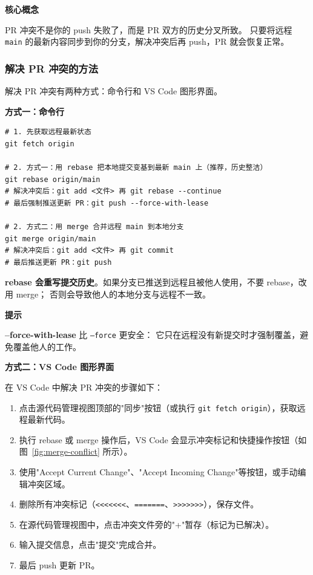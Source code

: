 \documentclass[12pt,a4paper,openany]{ctexbook}
\newenvironment{tipbox}{%
  \medskip
  \noindent\textbf{\faLightbulb\; 提示}
  \smallskip
}{%
  \medskip
}
\newenvironment{keybox}{%
  \medskip
  \noindent\textbf{\faKey\; 核心概念}
  \smallskip
}{%
  \medskip
}
\begin{document}
\begin{keybox}
PR 冲突不是你的 push 失败了，而是 PR 双方的历史分叉所致。
只要将远程 \texttt{main} 的最新内容同步到你的分支，解决冲突后再 push，PR 就会恢复正常。
\end{keybox}

\subsubsection{解决 PR 冲突的方法}

解决 PR 冲突有两种方式：命令行和 VS Code 图形界面。

\textbf{方式一：命令行}

\begin{lstlisting}[style=shell]
# 1. 先获取远程最新状态
git fetch origin

# 2. 方式一：用 rebase 把本地提交变基到最新 main 上（推荐，历史整洁）
git rebase origin/main
# 解决冲突后：git add <文件> 再 git rebase --continue
# 最后强制推送更新 PR：git push --force-with-lease

# 2. 方式二：用 merge 合并远程 main 到本地分支
git merge origin/main
# 解决冲突后：git add <文件> 再 git commit
# 最后推送更新 PR：git push
\end{lstlisting}

\begin{warnbox}
\textbf{rebase 会重写提交历史}。如果分支已推送到远程且被他人使用，不要 rebase，改用 merge；
否则会导致他人的本地分支与远程不一致。
\end{warnbox}

\begin{tipbox}
\textbf{--force-with-lease} 比 \texttt{--force} 更安全：
它只在远程没有新提交时才强制覆盖，避免覆盖他人的工作。
\end{tipbox}

\textbf{方式二：VS Code 图形界面}

在 VS Code 中解决 PR 冲突的步骤如下：

\begin{enumerate}[leftmargin=1.5em]
  \item 点击源代码管理视图顶部的"同步"按钮（或执行 \texttt{git fetch origin}），获取远程最新代码。
  \item 执行 rebase 或 merge 操作后，VS Code 会显示冲突标记和快捷操作按钮（如图~\ref{fig:merge-conflict} 所示）。
  \item 使用"Accept Current Change"、"Accept Incoming Change"等按钮，或手动编辑冲突区域。
  \item 删除所有冲突标记（\texttt{<<<<<<<}、\texttt{=======}、\texttt{>>>>>>>}），保存文件。
  \item 在源代码管理视图中，点击冲突文件旁的"+"暂存（标记为已解决）。
  \item 输入提交信息，点击"提交"完成合并。
  \item 最后 push 更新 PR。
\end{enumerate}
\end{document}
